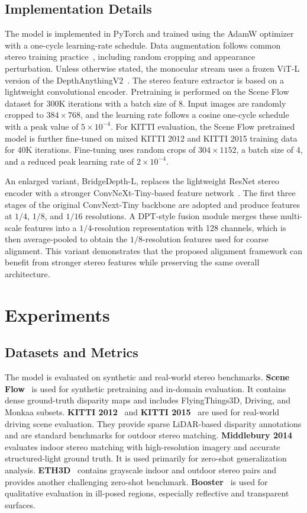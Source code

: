 \subsection{Implementation Details}
The model is implemented in PyTorch and trained using the AdamW optimizer with a one-cycle learning-rate schedule.
Data augmentation follows common stereo training practice~\cite{guan2024neural,lipson2021raft}, including random cropping and appearance perturbation.
Unless otherwise stated, the monocular stream uses a frozen ViT-L version of the DepthAnythingV2~\cite{yang2024depth}.
The stereo feature extractor is based on a lightweight convolutional encoder.
Pretraining is performed on the Scene Flow dataset for 300K iterations with a batch size of 8.
Input images are randomly cropped to $384 \times 768$, and the learning rate follows a cosine one-cycle schedule with a peak value of $5\times10^{-4}$.
For KITTI evaluation, the Scene Flow pretrained model is further fine-tuned on mixed KITTI 2012 and KITTI 2015 training data for 40K iterations. 
Fine-tuning uses random crops of $304 \times 1152$, a batch size of 4, and a reduced peak learning rate of $2\times10^{-4}$.

An enlarged variant, BridgeDepth-L, replaces the lightweight ResNet stereo encoder with a stronger ConvNeXt-Tiny-based feature network~\cite{liu2022convnet}. 
The first three stages of the original ConvNext-Tiny backbone are adopted and produce features at $1/4$, $1/8$, and $1/16$ resolutions. 
A DPT-style fusion module merges these multi-scale features into a $1/4$-resolution representation with 128 channels, which is then average-pooled to obtain the $1/8$-resolution features used for coarse alignment. 
This variant demonstrates that the proposed alignment framework can benefit from stronger stereo features while preserving the same overall architecture.

\section{Experiments}
\subsection{Datasets and Metrics}
The model is evaluated on synthetic and real-world stereo benchmarks.
\textbf{Scene Flow}~\cite{mayer2016large} is used for synthetic pretraining and in-domain evaluation. 
It contains dense ground-truth disparity maps and includes FlyingThings3D, Driving, and Monkaa subsets.
\textbf{KITTI 2012}~\cite{geiger2012we} and \textbf{KITTI 2015}~\cite{menze2015object} are used for real-world driving scene evaluation.
They provide sparse LiDAR-based disparity annotations and are standard benchmarks for outdoor stereo matching.
\textbf{Middlebury 2014}~\cite{scharstein2014high} evaluates indoor stereo matching with high-resolution imagery and accurate structured-light ground truth.
It is used primarily for zero-shot generalization analysis.
\textbf{ETH3D}~\cite{schops2017multi} contains grayscale indoor and outdoor stereo pairs and provides another challenging zero-shot benchmark.
\textbf{Booster}~\cite{zamaramirez2022booster} is used for qualitative evaluation in ill-posed regions, especially reflective and transparent surfaces.

